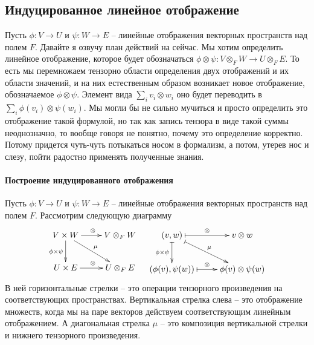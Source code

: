 \subsection{Индуцированное линейное отображение}

Пусть $\phi\colon V\to U$ и $\psi\colon W\to E$ -- линейные отображения векторных пространств над полем $F$. Давайте я озвучу план  действий на сейчас. Мы хотим определить линейное отображение, которое будет обозначаться $\phi\otimes \psi\colon V\otimes_F W\to U\otimes_F E$. То есть мы перемножаем тензорно области определения двух отображений и их области значений, и на них естественным образом возникает новое отображение, обозначаемое $\phi\otimes\psi$. Элемент вида $\sum_i v_i\otimes w_i$ оно будет переводить в $\sum_i \phi(v_i) \otimes \psi(w_i)$. Мы могли бы не сильно мучиться и просто определить это отображение такой формулой, но так как запись тензора в виде такой суммы неоднозначно, то вообще говоря не понятно, почему это определение корректно. Потому придется чуть-чуть потыкаться носом в формализм, а потом, утерев нос и слезу, пойти радостно применять полученные знания.

\paragraph{Построение индуцированного отображения}

Пусть $\phi\colon V\to U$ и $\psi\colon W\to E$ -- линейные отображения векторных пространств над полем $F$. Рассмотрим следующую диаграмму
\[
\xymatrix{
	{V\times W}\ar[d]_{\phi\times \psi}\ar[r]^{\otimes}\ar[rd]^{\mu}&{V\otimes_F W}\\
	{U\times E}\ar[r]^{\otimes}&{U\otimes_F E}
}
\quad
\xymatrix{
	{(v, w)}\ar@{|->}[d]_{\phi\times\psi}\ar@{|->}[r]^{\otimes}\ar@{|->}[rd]^{\mu}&{v\otimes w}\\
	{(\phi(v), \psi(w))}\ar@{|->}[r]^{\otimes}&{\phi(v)\otimes\psi(w)}
}
\]
В ней горизонтальные стрелки -- это операции тензорного произведения  на соответствующих пространствах. Вертикальная стрелка слева -- это отображение множеств, когда мы на паре векторов действуем соответствующим линейным отображением. А диагональная стрелка $\mu$ -- это композиция вертикальной стрелки и нижнего тензорного произведения.

